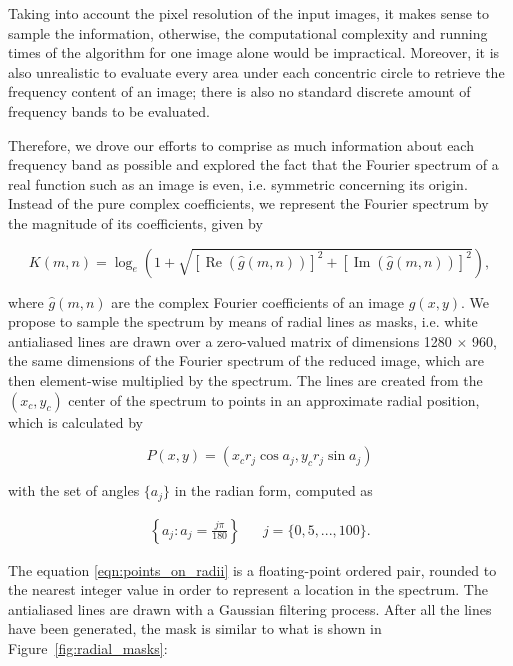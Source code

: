 Taking into account the pixel resolution of the input images, it makes sense to sample the information, otherwise, the computational complexity and running times of the algorithm for one image alone would be impractical. Moreover, it is also unrealistic to evaluate every area under each concentric circle to retrieve the frequency content of an image; there is also no standard discrete amount of frequency bands to be evaluated.

Therefore, we drove our efforts to comprise as much information about each frequency band as possible and explored the fact that the Fourier spectrum of a real function such as an image is even, i.e. symmetric concerning its origin. Instead of the pure complex coefficients, we represent the Fourier spectrum by the magnitude of its coefficients, given by

\begin{equation}
\label{eqn:magnitude_of_DFT}
K(m,n) = 
    \log_{e}{\left(1
    + \sqrt{
        [\operatorname{Re}{(\hat{g}(m,n))}]^{2}
        + [\operatorname{Im}{(\hat{g}(m,n))}]^{2}
      }
    \right)},
\end{equation}

\noindent where $\hat{g}(m,n)$ are the complex Fourier coefficients of an image $g(x,y)$. We propose to sample the spectrum by means of radial lines as masks, i.e. white antialiased lines are drawn over a zero-valued matrix of dimensions 1280 $\times$ 960, the same dimensions of the Fourier spectrum of the reduced image, which are then element-wise multiplied by the spectrum. The lines are created from the $(x_{c},y_{c})$ center of the spectrum to points in an approximate radial position, which is calculated by

\begin{equation}
\label{eqn:points_on_radii}
P(x,y) = 
    (
    x_{c} r_{j} \cos{a_{j}}, 
    y_{c} r_{j} \sin{a_{j}}
    )
\end{equation}

\noindent with the set of angles $\{a_{j}\}$ in the radian form, computed as

\begin{align}
\label{eqn:angles}
\left\{
a_{j} : a_{j} = 
\frac{j \pi}{180}
\right\}
&&  j = \{0,5,...,100\}.
\end{align}

\noindent The equation
\ref{eqn:points_on_radii} is a
floating-point ordered pair, rounded to the nearest integer value in order to represent a location in the spectrum. The
antialiased lines are drawn with a Gaussian filtering process. After all the lines have been generated, the mask is similar to what is shown in Figure~\ref{fig:radial_masks}:

